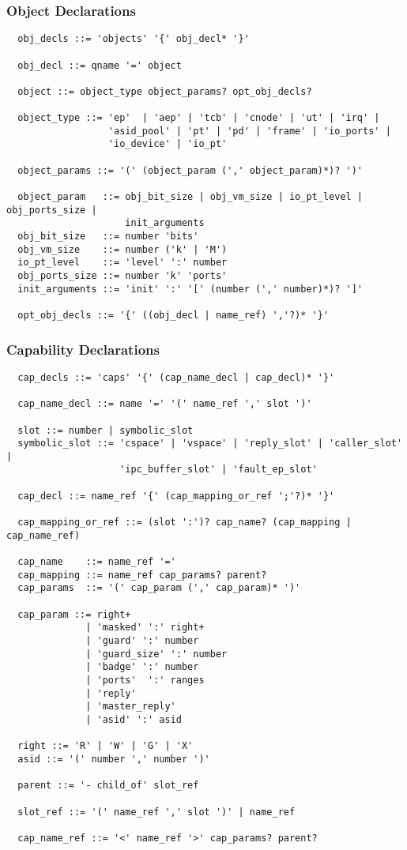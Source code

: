 \documentclass[a4paper,11pt]{article}
\begin{document}
\subsubsection{Object Declarations}

\begin{verbatim}
  obj_decls ::= 'objects' '{' obj_decl* '}'

  obj_decl ::= qname '=' object

  object ::= object_type object_params? opt_obj_decls?

  object_type ::= 'ep'  | 'aep' | 'tcb' | 'cnode' | 'ut' | 'irq' |
                  'asid_pool' | 'pt' | 'pd' | 'frame' | 'io_ports' |
                  'io_device' | 'io_pt' 

  object_params ::= '(' (object_param (',' object_param)*)? ')'

  object_param   ::= obj_bit_size | obj_vm_size | io_pt_level | obj_ports_size |
                     init_arguments
  obj_bit_size   ::= number 'bits'
  obj_vm_size    ::= number ('k' | 'M')
  io_pt_level    ::= 'level' ':' number
  obj_ports_size ::= number 'k' 'ports'
  init_arguments ::= 'init' ':' '[' (number (',' number)*)? ']'

  opt_obj_decls ::= '{' ((obj_decl | name_ref) ','?)* '}'
\end{verbatim}


\subsubsection{Capability Declarations}

\begin{verbatim}
  cap_decls ::= 'caps' '{' (cap_name_decl | cap_decl)* '}'

  cap_name_decl ::= name '=' '(' name_ref ',' slot ')'

  slot ::= number | symbolic_slot
  symbolic_slot ::= 'cspace' | 'vspace' | 'reply_slot' | 'caller_slot' |
                    'ipc_buffer_slot' | 'fault_ep_slot'

  cap_decl ::= name_ref '{' (cap_mapping_or_ref ';'?)* '}'

  cap_mapping_or_ref ::= (slot ':')? cap_name? (cap_mapping | cap_name_ref)

  cap_name    ::= name_ref '='
  cap_mapping ::= name_ref cap_params? parent?
  cap_params  ::= '(' cap_param (',' cap_param)* ')' 

  cap_param ::= right+
              | 'masked' ':' right+
              | 'guard' ':' number
              | 'guard_size' ':' number
              | 'badge' ':' number
              | 'ports'  ':' ranges
              | 'reply'
              | 'master_reply'
              | 'asid' ':' asid

  right ::= 'R' | 'W' | 'G' | 'X'
  asid ::= '(' number ',' number ')'

  parent ::= '- child_of' slot_ref

  slot_ref ::= '(' name_ref ',' slot ')' | name_ref

  cap_name_ref ::= '<' name_ref '>' cap_params? parent?
\end{verbatim}
\end{document}
